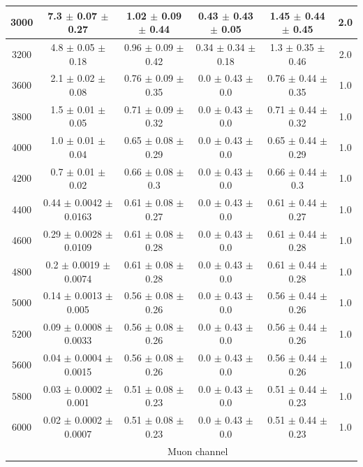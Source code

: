 \begin{table}[htp]
{\begin{tabular}{|c|c|c|c|c|c|}
			3000 & 7.3 $\pm$ 0.07 $\pm$ 0.27 & 1.02 $\pm$ 0.09 $\pm$ 0.44 & 0.43 $\pm$ 0.43 $\pm$ 0.05 & 1.45 $\pm$ 0.44 $\pm$ 0.45 & 2.0     \\ \hline
			3200 & 4.8 $\pm$ 0.05 $\pm$ 0.18 & 0.96 $\pm$ 0.09 $\pm$ 0.42 & 0.34 $\pm$ 0.34 $\pm$ 0.18 & 1.3 $\pm$ 0.35 $\pm$ 0.46 & 2.0     \\ \hline
			3600 & 2.1 $\pm$ 0.02 $\pm$ 0.08 & 0.76 $\pm$ 0.09 $\pm$ 0.35 & 0.0 $\pm$ 0.43 $\pm$ 0.0 & 0.76 $\pm$ 0.44 $\pm$ 0.35 & 1.0     \\ \hline
			3800 & 1.5 $\pm$ 0.01 $\pm$ 0.05 & 0.71 $\pm$ 0.09 $\pm$ 0.32 & 0.0 $\pm$ 0.43 $\pm$ 0.0 & 0.71 $\pm$ 0.44 $\pm$ 0.32 & 1.0     \\ \hline
			4000 & 1.0 $\pm$ 0.01 $\pm$ 0.04 & 0.65 $\pm$ 0.08 $\pm$ 0.29 & 0.0 $\pm$ 0.43 $\pm$ 0.0 & 0.65 $\pm$ 0.44 $\pm$ 0.29 & 1.0     \\ \hline
			4200 & 0.7 $\pm$ 0.01 $\pm$ 0.02 & 0.66 $\pm$ 0.08 $\pm$ 0.3 & 0.0 $\pm$ 0.43 $\pm$ 0.0 & 0.66 $\pm$ 0.44 $\pm$ 0.3 & 1.0     \\ \hline
			4400 & 0.44 $\pm$ 0.0042 $\pm$ 0.0163 & 0.61 $\pm$ 0.08 $\pm$ 0.27 & 0.0 $\pm$ 0.43 $\pm$ 0.0 & 0.61 $\pm$ 0.44 $\pm$ 0.27 & 1.0     \\ \hline
			4600 & 0.29 $\pm$ 0.0028 $\pm$ 0.0109 & 0.61 $\pm$ 0.08 $\pm$ 0.28 & 0.0 $\pm$ 0.43 $\pm$ 0.0 & 0.61 $\pm$ 0.44 $\pm$ 0.28 & 1.0     \\ \hline
			4800 & 0.2 $\pm$ 0.0019 $\pm$ 0.0074 & 0.61 $\pm$ 0.08 $\pm$ 0.28 & 0.0 $\pm$ 0.43 $\pm$ 0.0 & 0.61 $\pm$ 0.44 $\pm$ 0.28 & 1.0     \\ \hline
			5000 & 0.14 $\pm$ 0.0013 $\pm$ 0.005 & 0.56 $\pm$ 0.08 $\pm$ 0.26 & 0.0 $\pm$ 0.43 $\pm$ 0.0 & 0.56 $\pm$ 0.44 $\pm$ 0.26 & 1.0     \\ \hline
			5200 & 0.09 $\pm$ 0.0008 $\pm$ 0.0033 & 0.56 $\pm$ 0.08 $\pm$ 0.26 & 0.0 $\pm$ 0.43 $\pm$ 0.0 & 0.56 $\pm$ 0.44 $\pm$ 0.26 & 1.0     \\ \hline
			5600 & 0.04 $\pm$ 0.0004 $\pm$ 0.0015 & 0.56 $\pm$ 0.08 $\pm$ 0.26 & 0.0 $\pm$ 0.43 $\pm$ 0.0 & 0.56 $\pm$ 0.44 $\pm$ 0.26 & 1.0     \\ \hline
			5800 & 0.03 $\pm$ 0.0002 $\pm$ 0.001 & 0.51 $\pm$ 0.08 $\pm$ 0.23 & 0.0 $\pm$ 0.43 $\pm$ 0.0 & 0.51 $\pm$ 0.44 $\pm$ 0.23 & 1.0     \\ \hline
			6000 & 0.02 $\pm$ 0.0002 $\pm$ 0.0007 & 0.51 $\pm$ 0.08 $\pm$ 0.23 & 0.0 $\pm$ 0.43 $\pm$ 0.0 & 0.51 $\pm$ 0.44 $\pm$ 0.23 & 1.0     \\ \hline
		& \multicolumn{5}{c|}{Muon channel}  \\

\end{tabular}}
\end{table}
